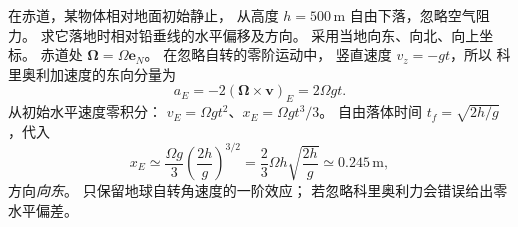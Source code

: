 在赤道，某物体相对地面初始静止，
从高度 $h=500\,\mathrm m$ 自由下落，忽略空气阻力。
求它落地时相对铅垂线的水平偏移及方向。
\exsolution
采用当地向东、向北、向上坐标。
赤道处 $\bm\Omega=\Omega\bm e_N$。
在忽略自转的零阶运动中，
竖直速度 $v_z=-gt$，所以
科里奥利加速度的东向分量为
\[
a_E=-2(\bm\Omega\times\bm v)_E=2\Omega gt.
\]
从初始水平速度零积分：
$v_E=\Omega gt^2$、$x_E=\Omega gt^3/3$。
自由落体时间 $t_f=\sqrt{2h/g}$，代入
\[
\boxed{x_E\simeq\frac{\Omega g}{3}
\left(\frac{2h}{g}\right)^{3/2}
=\frac23\Omega h\sqrt{\frac{2h}{g}}
\simeq0.245\,\mathrm m},
\]
方向\emph{向东}。
\excheck 只保留地球自转角速度的一阶效应；
若忽略科里奥利力会错误给出零水平偏差。
